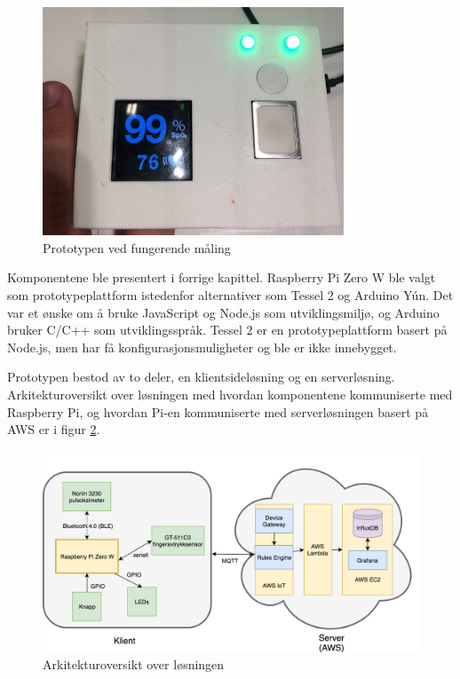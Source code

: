 \begin{figure}
\includegraphics[width=0.8\textwidth, center]{fig/prototype/ekte_prototype}
\caption{Prototypen ved fungerende måling}
\label{fig:ekte_prototype}
\end{figure}

Komponentene ble presentert i forrige kapittel. Raspberry Pi Zero W ble valgt som prototypeplattform istedenfor
alternativer som Tessel 2 og Arduino Yún. Det var et ønske om å bruke JavaScript og Node.js som utviklingsmiljø, og Arduino
bruker C/C++ som utviklingsspråk. Tessel 2 er en prototypeplattform basert på Node.js, men har få konfigurasjonsmuligheter
og \gls{ble} er ikke innebygget.

Prototypen bestod av to deler, en klientsideløsning og en serverløsning.
Arkitekturoversikt over løsningen med hvordan komponentene kommuniserte med Raspberry Pi, og hvordan
Pi-en kommuniserte med serverløsningen basert på AWS er i figur \ref{fig:prototypeoversikt}.
\begin{figure}
\includegraphics[width=1.0\textwidth, center]{fig/arkitektur}
\caption{Arkitekturoversikt over løsningen}
\label{fig:prototypeoversikt}
\end{figure}

